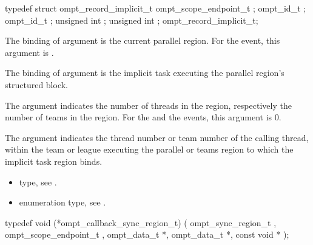 \record

\begin{ccppspecific}
\begin{omptRecord}
typedef struct ompt_record_implicit_t {
  ompt_scope_endpoint_t ;
  ompt_id_t ;
  ompt_id_t ;
  unsigned int ;
  unsigned int ;
} ompt_record_implicit_t;
\end{omptRecord}
\end{ccppspecific}


\argdesc

\epdesc

The binding of argument  is the current
parallel region.
For the  event, this argument is .

The binding of argument  is the implicit task
executing the parallel region's structured block.

The argument  indicates the number of
threads in the  region, respectively the number of 
teams in the  region.
For the  and the  events, 
this argument is 0.

The argument  indicates the thread number or team number 
of the calling thread, within the team or league executing the 
parallel or teams region to which the implicit task region binds.

\crossreferences
\begin{itemize}
\item {} type, see
.
\item {} enumeration type, see
.
\end{itemize}



\label{sec:ompt_callback_sync_region_t}
\format

\begin{ccppspecific}
\begin{omptCallback}
typedef void (*ompt_callback_sync_region_t) (
  ompt_sync_region_t ,
  ompt_scope_endpoint_t ,
  ompt_data_t *,
  ompt_data_t *,
  const void *
);
\end{omptCallback}
\end{ccppspecific}



